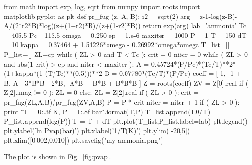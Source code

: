 \documentclass[11pt]{article}
\begin{document}
\begin{enumerate}
\begin{python}
from math import exp, log, sqrt
from numpy import roots
import matplotlib.pyplot as plt
def pr_fug (z, A, B):
   r2 = sqrt(2)
   arg = z-1-log(z-B)-A/(2*r2*B)*log((z+(1+r2)*B)/(z+(1-r2)*B))
   return exp(arg)
lab='ammonia'
Tc = 405.5                                                                                                                                                                               
Pc =113.5                                                                                                                                                                                
omega = 0.250                                                                                                                                                                            
ep = 1.e-6                                                                                                                                                                               
maxiter = 1000                                                                                                                                                                           
P = 1                                                                                                                                                                                    
T = 150
dT = 10
kappa = 0.37464 + 1.54226*omega - 0.26992*omega*omega
T_list=[]
P_list=[]
ZL=ep
while ( ZL > 0 and T < Tc ):
   crit = 0
   niter = 0
   while ( ZL > 0 and abs(1-crit) > ep and niter < maxiter ):
      A = 0.45724*(P/Pc)*(Tc/T)**2*(1+kappa*(1-(T/Tc)**(0.5)))**2
      B = 0.07780*(Tc/T)*(P/Pc)
      coeff = [ 1, -1 + B, A - 3*B*B - 2*B, -A*B + B*B + B*B*B ]
      Z = roots(coeff)
      ZV = Z[0].real
      if ( Z[2].imag != 0 ):
         ZL = 0
      else:
         ZL = Z[2].real
      if ( ZL > 0 ):
         crit = pr_fug(ZL,A,B)/pr_fug(ZV,A,B)
         P = P * crit
         niter = niter + 1
   if ( ZL > 0 ):
      print "T = {0:.3f} K, P = {1:.8f} bar".format(T,P) 
      T_list.append(1.0/T)
      P_list.append(log(P))
      T = T + dT
plt.plot(T_list,P_list,label=lab)
plt.legend()
plt.ylabel('ln Pvap(bar)')
plt.xlabel('1/T(K)')
plt.ylim([-20,5])
plt.xlim([0.002,0.010])
plt.savefig("my-ammonia.png")
\end{python}

The plot is shown in Fig.~\ref{fig:pvap}.


\end{enumerate}
\end{document}
